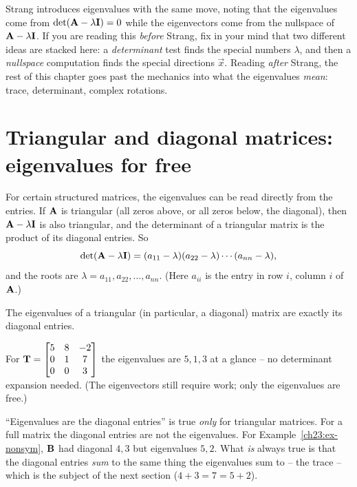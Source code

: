 \begin{strangbox}
Strang introduces eigenvalues with the same move, noting that the eigenvalues
come from $\det(\mathbf{A}-\lambda\mathbf{I})=0$ while the eigenvectors come from the
nullspace of $\mathbf{A}-\lambda\mathbf{I}$. If you are reading this \emph{before}
Strang, fix in your mind that two different ideas are stacked here: a
\emph{determinant} test finds the special numbers $\lambda$, and then a
\emph{nullspace} computation finds the special directions $\vec{x}$. Reading
\emph{after} Strang, the rest of this chapter goes past the mechanics into what the
eigenvalues \emph{mean}: trace, determinant, complex rotations.
\end{strangbox}

\section{Triangular and diagonal matrices: eigenvalues for free}
\label{ch23:triangular}

For certain structured matrices, the eigenvalues can be read directly from the entries. If $\mathbf{A}$ is triangular
(all zeros above, or all zeros below, the diagonal), then $\mathbf{A}-\lambda\mathbf{I}$
is also triangular, and the determinant of a triangular matrix is the product
of its diagonal entries. So
\[
  \det(\mathbf{A}-\lambda\mathbf{I})=(a_{11}-\lambda)(a_{22}-\lambda)\cdots(a_{nn}-\lambda),
\]
and the roots are $\lambda=a_{11},a_{22},\dots,a_{nn}$. (Here $a_{ii}$ is the
entry in row $i$, column $i$ of $\mathbf{A}$.)

\begin{proposition}
\label{ch23:prop-triangular}
The eigenvalues of a triangular (in particular, a diagonal) matrix are exactly its
diagonal entries.
\end{proposition}

\begin{example}
\label{ch23:ex-tri}
For $\mathbf{T}=\begin{bmatrix}5 & 8 & -2\\ 0 & 1 & 7\\ 0 & 0 & 3\end{bmatrix}$ the
eigenvalues are $5,1,3$ at a glance -- no determinant expansion needed. (The
eigenvectors still require work; only the eigenvalues are free.)
\end{example}

\begin{trapbox}
``Eigenvalues are the diagonal entries'' is true \emph{only} for triangular
matrices. For a full matrix the diagonal entries are not the eigenvalues. For
Example~\ref{ch23:ex-nonsym}, $\mathbf{B}$ had diagonal $4,3$ but eigenvalues $5,2$.
What \emph{is} always true is that the diagonal entries \emph{sum} to the same
thing the eigenvalues sum to -- the trace -- which is the subject of the next
section ($4+3=7=5+2$).
\end{trapbox}

